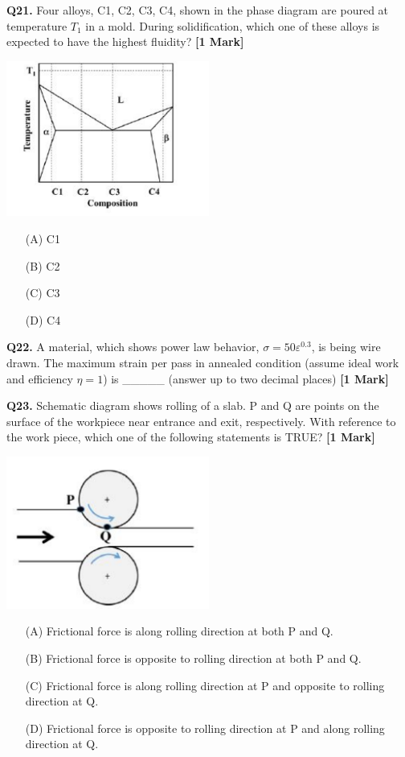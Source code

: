 \documentclass[11pt]{article}
\newcommand{\questiona}[2]{
    \noindent\textbf{Q#2.} #1 \hfill \textbf{[1 Mark]}
}
\begin{document}
\questiona{Four alloys, C1, C2, C3, C4, shown in the phase diagram are poured at temperature \( T_1 \) in a mold. During solidification, which one of these alloys is expected to have the highest fluidity?}{21}
\begin{center}
\includegraphics[width=0.5\textwidth]{figures/21.png}
\end{center}
\begin{enumerate}
    \item[(A)] C1
    \item[(B)] C2
    \item[(C)] C3
    \item[(D)] C4
\end{enumerate}
\vspace{0.5cm}

\questiona{A material, which shows power law behavior, \(\sigma = 50 \varepsilon^{0.3}\), is being wire drawn. The maximum strain per pass in annealed condition (assume ideal work and efficiency \( \eta = 1 \)) is \_\_\_\_\_ (answer up to two decimal places)}{22}
\vspace{0.5cm}

\questiona{Schematic diagram shows rolling of a slab. P and Q are points on the surface of the workpiece near entrance and exit, respectively. With reference to the work piece, which one of the following statements is TRUE?}{23}
\begin{center}
\includegraphics[width=0.5\textwidth]{figures/23.png}
\end{center}
\begin{enumerate}
    \item[(A)] Frictional force is along rolling direction at both P and Q.
    \item[(B)] Frictional force is opposite to rolling direction at both P and Q.
    \item[(C)] Frictional force is along rolling direction at P and opposite to rolling direction at Q.
    \item[(D)] Frictional force is opposite to rolling direction at P and along rolling direction at Q.
\end{enumerate}
\vspace{0.5cm}
\end{document}
